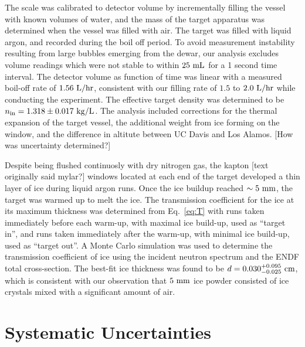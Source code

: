 \documentclass[%
 reprint,
superscriptaddress,
 preprintnumbers,
 nofootinbib,
 nobibnotes,
 bibnotes,
 amsmath,amssymb,
 aps,
 prl, 
 floatfix,
]{revtex4-1}
\begin{document}
The scale was calibrated to detector volume by incrementally filling
the vessel with known volumes of water, and the mass of the target
apparatus was determined when the vessel was filled with air.  The
target was filled with liquid argon, and recorded during the boil off
period.  To avoid measurement instability resulting from large bubbles
emerging from the dewar, our analysis excludes volume readings which
were not stable to within $25~\rm mL$ for a 1 second time interval.
The detector volume as function of time was linear with a measured
boil-off rate of $1.56~\rm L/hr$, consistent with our filling rate of
$1.5$ to $2.0~\rm L/hr$ while conducting the experiment.  The
effective target density was determined to be $n_{\rm in} = 1.318 \pm
0.017~{\rm kg/L}$.  The analysis included corrections for the thermal
expansion of the target vessel, the additional weight from ice forming
on the window, and the difference in altitute between UC Davis and Los
Alamos.
{\color{red} [How was uncertainty determined?]}

Despite being flushed continuosly with dry nitrogen gas, the kapton
{\color{red} [text originally said mylar?]} windows located at each
end of the target developed a thin layer of ice during liquid argon
runs.  Once the ice buildup reached $\sim 5~\rm mm$, the target was
warmed up to melt the ice.  The transmission coefficient for the ice
at its maximum thickness was determined from Eq.~\ref{eq:T} with runs
taken immediately before each warm-up, with maximal ice build-up, used
as ``target in'', and runs taken immediately after the warm-up, with
minimal ice build-up, used as ``target out''.  A Monte Carlo
simulation was used to determine the transmission coefficient of ice
using the incident neutron spectrum and the ENDF total cross-section.
The best-fit ice thickness was found to be $d =
0.030^{+0.095}_{-0.025}~\rm cm$, which is consistent with our
observation that $5~\rm mm$ ice powder consisted of ice crystals mixed
with a significant amount of air.

\section{\label{sec:energy}Systematic Uncertainties}
\end{document}
